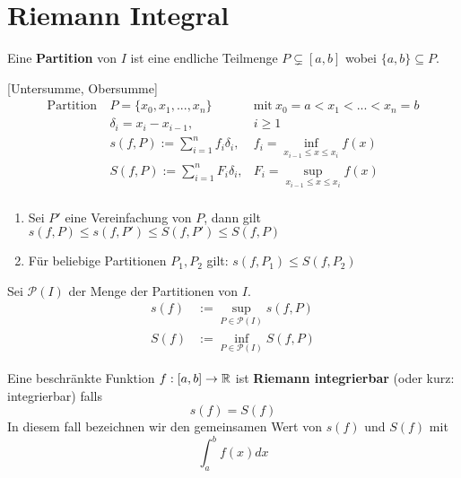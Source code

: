 \section{Riemann Integral}

\begin{definition}{5.1}
    Eine \textbf{Partition} von $I$ ist eine endliche Teilmenge $P \subsetneq [a, b]$ wobei $\{a,b\} \subseteq P$.
\end{definition}

\begin{definition}{}[Untersumme, Obersumme]
    \begin{alignat*}{2}
        \mbox{Partition}\  & P = \{x_0, x_1, ..., x_n\}\           & \mbox{mit}\ x_0 = a < x_1 < ... < x_n = b \\
                           & \delta_i = x_i - x_{i - 1},           & i \ge 1                                   \\
                           & s(f, P) := \sum_{i=1}^n f_i \delta_i, & f_i = \inf_{x_{i - 1} \le x \le x_i} f(x) \\
                           & S(f, P) := \sum_{i=1}^n F_i \delta_i, & F_i = \sup_{x_{i - 1} \le x \le x_i} f(x) \\
    \end{alignat*}
\end{definition}

\begin{lemma}{5.2}
    \begin{enumerate}
        \item Sei $P'$ eine Vereinfachung von $P$, dann gilt $s(f, P) \le s(f, P') \le S(f, P') \le S(f, P)$
        \item Für beliebige Partitionen $P_1, P_2$ gilt: $s(f, P_1) \le S(f, P_2)$
    \end{enumerate}
\end{lemma}

\begin{definition}{}
    Sei $\mathcal{P}(I)$ der Menge der Partitionen von $I$.
    \begin{align*}
        s(f) & := \sup_{P \in \mathcal{P}(I)} s(f, P) \\
        S(f) & := \inf_{P \in \mathcal{P}(I)} S(f, P)
    \end{align*}
\end{definition}

\begin{satz}{5.3}
    Eine beschränkte Funktion $f: [a,b] \to \mathbb{R}$ ist \textbf{Riemann integrierbar} (oder kurz: integrierbar) falls
    \[ s(f) = S(f) \]
    In diesem fall bezeichnen wir den gemeinsamen Wert von $s(f)$ und $S(f)$ mit
    \[ \int_a^b f(x) dx \]
\end{satz}

